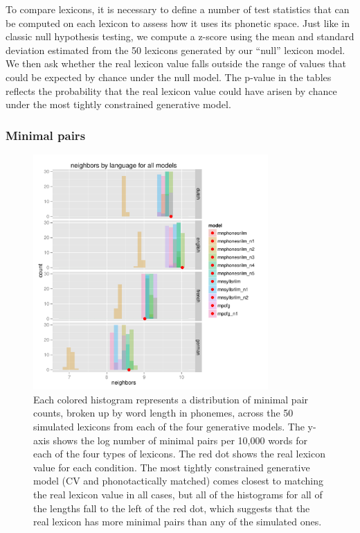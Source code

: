 \documentclass{article}
\begin{document}
 
To compare lexicons, it is necessary to define a number of test statistics that can be computed on each
lexicon to assess how it uses its phonetic space. Just like in classic null hypothesis testing, we compute a
z-score using the mean and standard deviation estimated from the 50 lexicons generated by our ``null'' lexicon
model. We then ask whether the real lexicon value falls outside the range of values that could be expected by
chance under the null model. The p-value in the tables reflects the probability that the real lexicon value
could have arisen by chance under the most tightly constrained generative model.

\subsubsection{Minimal pairs} 

\begin{figure} \centering
  \includegraphics[width=0.8\textwidth]{PDFs/neighbors_all_models.pdf}
  \caption{Each colored histogram represents a distribution of minimal pair counts, broken up by word length
in phonemes, across the 50 simulated lexicons from each of the four generative models. The y-axis shows the
log number of minimal pairs per 10,000 words for each of the four types of lexicons. The red dot shows the
real lexicon value for each condition. The most tightly constrained generative model (CV and phonotactically
matched) comes closest to matching the real lexicon value in all cases, but all of the histograms for all of
the lengths fall to the left of the red dot, which suggests that the real lexicon has more minimal pairs than
any of the simulated ones.}
  \label{fig:pairs}
\end{figure}
\end{document}
